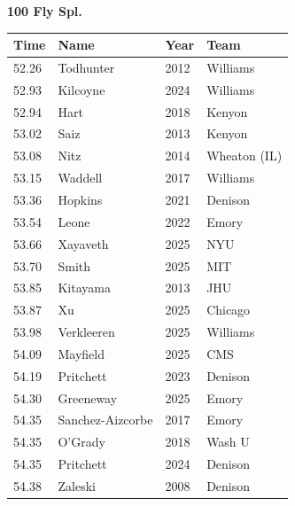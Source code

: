 \noindent\begin{minipage}[t]{0.98\textwidth}
\centering
\textbf{\textcolor{teamprimary}{100 Fly Spl.}}\par
\vspace{0.5em}
\centering
\small
\renewcommand{\arraystretch}{1.0}
\setlength{\tabcolsep}{4pt}
\begin{tabular}{@{}p{2.5cm}p{4.5cm}p{1.5cm}p{2.5cm}@{}}
\toprule
\textbf{Time} & \textbf{Name} & \textbf{Year} & \textbf{Team} \\
\midrule
52.26 & Todhunter & 2012 & Williams \\
52.93 & Kilcoyne & 2024 & Williams \\
52.94 & Hart & 2018 & Kenyon \\
53.02 & Saiz & 2013 & Kenyon \\
53.08 & Nitz & 2014 & Wheaton (IL) \\
53.15 & Waddell & 2017 & Williams \\
53.36 & Hopkins & 2021 & Denison \\
53.54 & Leone & 2022 & Emory \\
53.66 & Xayaveth & 2025 & NYU \\
53.70 & Smith & 2025 & MIT \\
53.85 & Kitayama & 2013 & JHU \\
53.87 & Xu & 2025 & Chicago \\
53.98 & Verkleeren & 2025 & Williams \\
54.09 & Mayfield & 2025 & CMS \\
54.19 & Pritchett & 2023 & Denison \\
54.30 & Greeneway & 2025 & Emory \\
54.35 & Sanchez-Aizcorbe & 2017 & Emory \\
54.35 & O'Grady & 2018 & Wash U \\
54.35 & Pritchett & 2024 & Denison \\
54.38 & Zaleski & 2008 & Denison \\
\bottomrule
\end{tabular}
\end{minipage}
\vspace{1.2em}
